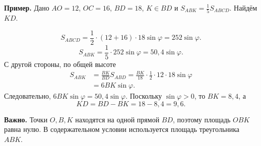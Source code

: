 \documentclass[a4paper,12pt]{article}
\newcommand{\ex}[1]{\par\smallskip\textcolor{darkaccent}{\textbf{Пример.}} #1\par}
\newcommand{\warn}[1]{\par\textbf{Важно.} #1\par}
\begin{document}
\begin{center}
\end{center}

\ex{Дано $AO=12$, $OC=16$, $BD=18$, $K\in BD$ и $S_{ABK}=\frac15S_{ABCD}$. Найдём $KD$.}
\[
S_{ABCD}=\frac12\cdot(12+16)\cdot18\sin\varphi
=252\sin\varphi.
\]
\[
S_{ABK}=\frac15\cdot252\sin\varphi
=50{,}4\sin\varphi.
\]
С другой стороны, по общей высоте
\[
\begin{aligned}
S_{ABK}&=\frac{BK}{BD}S_{ABD}
=\frac{BK}{18}\cdot\frac12\cdot12\cdot18\sin\varphi\\
&=6BK\sin\varphi.
\end{aligned}
\]
Следовательно, $6BK\sin\varphi=50{,}4\sin\varphi$.
Поскольку $\sin\varphi>0$, то $BK=8{,}4$, а
\[
\boxed{KD=BD-BK=18-8{,}4=9{,}6}.
\]
\warn{Точки $O,B,K$ находятся на одной прямой $BD$, поэтому площадь $OBK$ равна нулю. В содержательном условии используется площадь треугольника $ABK$.}
\clearpage
\end{document}
